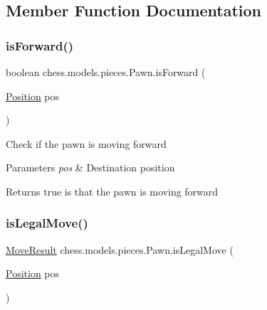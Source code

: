 \subsection{Member Function Documentation}
\mbox{\label{classchess_1_1models_1_1pieces_1_1_pawn_a80055e2b99a160f4de32644423460a6f}} 
\subsubsection{\texorpdfstring{is\+Forward()}{isForward()}}
{\footnotesize\ttfamily boolean chess.\+models.\+pieces.\+Pawn.\+is\+Forward (\begin{DoxyParamCaption}\item[{\mbox{\hyperlink{classchess_1_1models_1_1_position}{Position}}}]{pos }\end{DoxyParamCaption})}

Check if the pawn is moving forward 
\begin{DoxyParams}{Parameters}
{\em pos} & Destination position \\
\hline
\end{DoxyParams}
\begin{DoxyReturn}{Returns}
true is that the pawn is moving forward 
\end{DoxyReturn}
\mbox{\label{classchess_1_1models_1_1pieces_1_1_pawn_ae293ed0d437de535ad14a543a1077871}} 
\subsubsection{\texorpdfstring{is\+Legal\+Move()}{isLegalMove()}}
{\footnotesize\ttfamily \mbox{\hyperlink{enumchess_1_1models_1_1enums_1_1_move_result}{Move\+Result}} chess.\+models.\+pieces.\+Pawn.\+is\+Legal\+Move (\begin{DoxyParamCaption}\item[{\mbox{\hyperlink{classchess_1_1models_1_1_position}{Position}}}]{pos }\end{DoxyParamCaption})}

